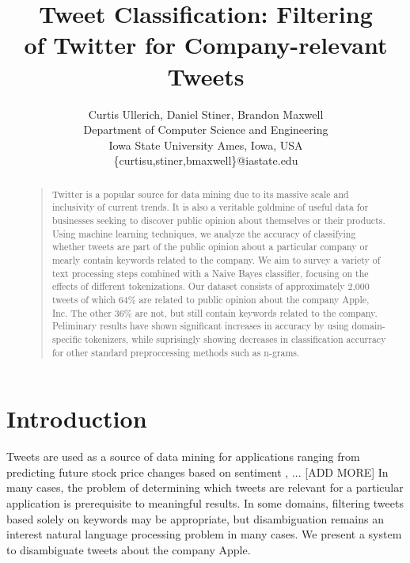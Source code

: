 \documentclass[letterpaper]{article}
\begin{document}
\title{Tweet Classification: Filtering \\ of Twitter for Company-relevant Tweets}
\author{
Curtis Ullerich, Daniel Stiner, Brandon Maxwell\\
Department of Computer Science and Engineering\\
Iowa State University
Ames, Iowa, USA\\
\{curtisu,stiner,bmaxwell\}@iastate.edu\\
}
\maketitle
\begin{abstract}
\begin{quote}
Twitter is a popular source for data mining due to its massive scale and inclusivity of current trends.
It is also a veritable goldmine of useful data for businesses seeking to discover public opinion about themselves or their products.
Using machine learning techniques, we analyze the accuracy of classifying whether tweets are part of the public opinion about a particular company or mearly contain keywords related to the company.
We aim to survey a variety of text processing steps combined with a Naive Bayes classifier, focusing on the effects of different tokenizations.
Our dataset consists of approximately 2,000 tweets of which 64\% are related to public opinion about the company Apple, Inc. The other 36\% are not, but still contain keywords related to the company.
Peliminary results have shown significant increases in accuracy %
by using domain-specific tokenizers, while suprisingly showing decreases in classification accurracy for other standard preproccessing methods such as n-grams.
\end{quote}
\end{abstract}

\section{Introduction}
Tweets are used as a source of data mining for applications ranging from predicting future stock price changes based on sentiment \citeauthor{Ruiz}, ... [ADD MORE]
In many cases, the problem of determining which tweets are relevant for a particular application is prerequisite to meaningful results. In some domains, filtering tweets based solely on keywords may be appropriate, but disambiguation remains an interest natural language processing problem in many cases. We present a system to disambiguate tweets about the company Apple.
\end{document}
